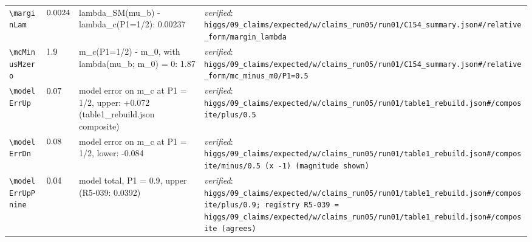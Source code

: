 {\begin{longtable}{@{}>{\raggedright\arraybackslash}p{}>{\raggedright\arraybackslash}p{}>{\raggedright\arraybackslash}p{}>{\raggedright\arraybackslash}p{}@{}}
\texttt{\textbackslash marginLam} & $0.0024$ & lambda\_\allowbreak{}SM(mu\_\allowbreak{}b) - lambda\_\allowbreak{}c(P1=1/\allowbreak{}2): 0.00237 & \emph{verified}: \texttt{higgs/\allowbreak{}09\_\allowbreak{}claims/\allowbreak{}expected/\allowbreak{}w/\allowbreak{}claims\_\allowbreak{}run05/\allowbreak{}run01/\allowbreak{}C154\_\allowbreak{}summary.json\#/\allowbreak{}relative\_\allowbreak{}form/\allowbreak{}margin\_\allowbreak{}lambda} \\
\texttt{\textbackslash mcMinusMzero} & $1.9$ & m\_\allowbreak{}c(P1=1/\allowbreak{}2) - m\_\allowbreak{}0, with lambda(mu\_\allowbreak{}b; m\_\allowbreak{}0) = 0: 1.87 & \emph{verified}: \texttt{higgs/\allowbreak{}09\_\allowbreak{}claims/\allowbreak{}expected/\allowbreak{}w/\allowbreak{}claims\_\allowbreak{}run05/\allowbreak{}run01/\allowbreak{}C154\_\allowbreak{}summary.json\#/\allowbreak{}relative\_\allowbreak{}form/\allowbreak{}mc\_\allowbreak{}minus\_\allowbreak{}m0/\allowbreak{}P1=0.5} \\
\texttt{\textbackslash modelErrUp} & $0.07$ & model error on m\_\allowbreak{}c at P1 = 1/\allowbreak{}2, upper: +0.072 (table1\_\allowbreak{}rebuild.json composite) & \emph{verified}: \texttt{higgs/\allowbreak{}09\_\allowbreak{}claims/\allowbreak{}expected/\allowbreak{}w/\allowbreak{}claims\_\allowbreak{}run05/\allowbreak{}run01/\allowbreak{}table1\_\allowbreak{}rebuild.json\#/\allowbreak{}composite/\allowbreak{}plus/\allowbreak{}0.5} \\
\texttt{\textbackslash modelErrDn} & $0.08$ & model error on m\_\allowbreak{}c at P1 = 1/\allowbreak{}2, lower: -0.084 & \emph{verified}: \texttt{higgs/\allowbreak{}09\_\allowbreak{}claims/\allowbreak{}expected/\allowbreak{}w/\allowbreak{}claims\_\allowbreak{}run05/\allowbreak{}run01/\allowbreak{}table1\_\allowbreak{}rebuild.json\#/\allowbreak{}composite/\allowbreak{}minus/\allowbreak{}0.5 (x -1) (magnitude shown)} \\
\texttt{\textbackslash modelErrUpPnine} & $0.04$ & model total, P1 = 0.9, upper (R5-039: 0.0392) & \emph{verified}: \texttt{higgs/\allowbreak{}09\_\allowbreak{}claims/\allowbreak{}expected/\allowbreak{}w/\allowbreak{}claims\_\allowbreak{}run05/\allowbreak{}run01/\allowbreak{}table1\_\allowbreak{}rebuild.json\#/\allowbreak{}composite/\allowbreak{}plus/\allowbreak{}0.9; registry R5-039 = higgs/\allowbreak{}09\_\allowbreak{}claims/\allowbreak{}expected/\allowbreak{}w/\allowbreak{}claims\_\allowbreak{}run05/\allowbreak{}run01/\allowbreak{}table1\_\allowbreak{}rebuild.json\#/\allowbreak{}composite (agrees)} \\

\end{longtable}}
